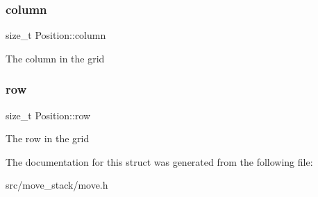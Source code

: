 \subsubsection{\texorpdfstring{column}{column}}
{\footnotesize\ttfamily size\+\_\+t Position\+::column}

The column in the grid \mbox{\label{struct_position_a55d3db7ca0f004461b890a5340a0cd24}} 
\subsubsection{\texorpdfstring{row}{row}}
{\footnotesize\ttfamily size\+\_\+t Position\+::row}

The row in the grid 

The documentation for this struct was generated from the following file\+:\begin{DoxyCompactItemize}
\item 
src/move\+\_\+stack/move.\+h\end{DoxyCompactItemize}
